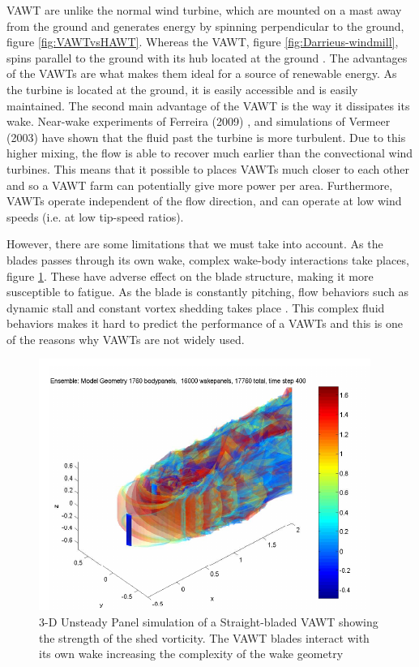 VAWT are unlike the normal wind turbine, which are mounted on a mast away from the ground and generates energy by spinning perpendicular to the ground, figure \ref{fig:VAWTvsHAWT}. Whereas the VAWT, figure \ref{fig:Darrieus-windmill}, spins parallel to the ground with its hub located at the ground \cite{website:wikiVAWT}. The advantages of the VAWTs are what makes them ideal for a source of renewable energy. As the turbine is located at the ground, it is easily accessible and is easily maintained. The second main advantage of the VAWT is the way it dissipates its wake. Near-wake experiments of Ferreira (2009) \cite{SimaoFerreira2009}, and simulations of Vermeer (2003) \cite{Vermeer2003} have shown that the fluid past the turbine is more turbulent. Due to this higher mixing, the flow is able to recover much earlier than the convectional wind turbines. This means that it possible to places VAWTs much closer to each other and so a VAWT farm can potentially give more power per area. Furthermore, VAWTs operate independent of the flow direction, and can operate at low wind speeds (i.e. at low tip-speed ratios).

However, there are some limitations that we must take into account. As the blades passes through its own wake, complex wake-body interactions take places, figure \ref{fig:3DunsteadyPanelVAWT}. These have adverse effect on the blade structure, making it more susceptible to fatigue. As the blade is constantly pitching, flow behaviors such as dynamic stall and constant vortex shedding takes place \cite{SimaoFerreira2008}. This complex fluid behaviors makes it hard to predict the performance of a VAWTs and this is one of the reasons why VAWTs are not widely used. 

	\begin{figure}[!t]
		\centering
		\includegraphics[width=0.6\linewidth]{figures/introduction/3DunsteadyPanelVAWT.png}
		\caption{3-D Unsteady Panel simulation of a Straight-bladed VAWT showing the strength of the shed vorticity. The VAWT blades interact with its own wake increasing the complexity of the wake geometry \cite{Dixon}}
		\label{fig:3DunsteadyPanelVAWT}
	\end{figure}

